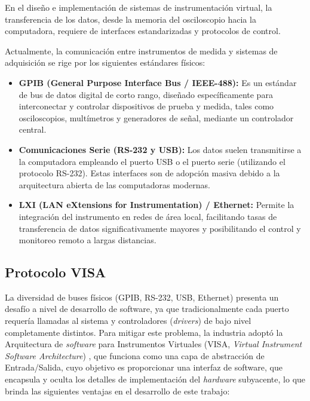 En el diseño e implementación de sistemas de instrumentación virtual, la transferencia de los datos, desde la memoria del osciloscopio hacia la computadora, requiere de interfaces estandarizadas y protocolos de control.

Actualmente, la comunicación entre instrumentos de medida y sistemas de adquisición se rige por los siguientes estándares físicos:

\begin{itemize}
    \item \textbf{GPIB (General Purpose Interface Bus / IEEE-488):} Es un estándar de bus de datos digital de corto rango, diseñado específicamente para interconectar y controlar dispositivos de prueba y medida, tales como osciloscopios, multímetros y generadores de señal, mediante un controlador central.
    \item \textbf{Comunicaciones Serie (RS-232 y USB):} Los datos suelen transmitirse a la computadora empleando el puerto USB o el puerto serie (utilizando el protocolo RS-232). Estas interfaces son de adopción masiva debido a la arquitectura abierta de las computadoras modernas.
    \item \textbf{LXI (LAN eXtensions for Instrumentation) / Ethernet:} Permite la integración del instrumento en redes de área local, facilitando tasas de transferencia de datos significativamente mayores y posibilitando el control y monitoreo remoto a largas distancias.
\end{itemize}

\subsection{Protocolo VISA}

La diversidad de buses físicos (GPIB, RS-232, USB, Ethernet) presenta un desafío a nivel de desarrollo de software, ya que tradicionalmente cada puerto requería llamadas al sistema y controladores (\emph{drivers}) de bajo nivel completamente distintos. Para mitigar este problema, la industria adoptó la Arquitectura de \emph{software} para Instrumentos Virtuales (VISA, \emph{Virtual Instrument Software Architecture}) \cite{rohde_schwarz_visa}, que funciona como una capa de abstracción de Entrada/Salida, cuyo objetivo es proporcionar una interfaz de software, que encapsula y oculta los detalles de implementación del \emph{hardware} subyacente, lo que brinda las siguientes ventajas en el desarrollo de este trabajo:

